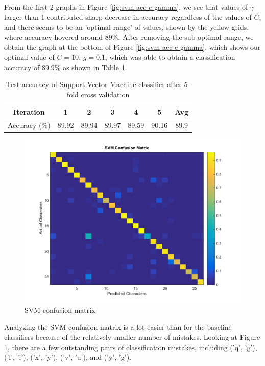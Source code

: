 \documentclass{article} %
\begin{document}
From the first 2 graphs in Figure \ref{fig:svm-acc-c-gamma}, we see that values of $\gamma$ larger than 1 contributed sharp decrease in accuracy regardless of the values of $C$, and there seems to be an 'optimal range' of values, shown by the yellow grids, where accuracy hovered around 89\%. After removing the sub-optimal range, we obtain the graph at the bottom of Figure \ref{fig:svm-acc-c-gamma}, which shows our optimal value of $C=10$, $g=0.1$, which was able to obtain a classification accuracy of $89.9\%$ as shown in Table \ref{tab:svm-cross-val}.

\begin{table}[h]
\centering
\begin{tabular}{|c|c|c|c|c|c|c|}
\hline
Iteration & 1 & 2 & 3 & 4 & 5 & Avg \\
\hline 
Accuracy (\%) & 89.92 & 89.94 & 89.97 & 89.59 & 90.16 & 89.9 \\
\hline 
\end{tabular}
\caption{Test accuracy of Support Vector Machine classifier after 5-fold cross validation}
\label{tab:svm-cross-val}
\end{table}

\begin{figure}[h]
\begin{center}
\includegraphics[scale=0.3]{confusion_svm.png}
\end{center}
\caption{SVM confusion matrix}
\label{fig:svm-conf-mat}
\end{figure}

Analyzing the SVM confusion matrix is a lot easier than for the baseline classifiers because of the relatively smaller number of mistakes. Looking at Figure \ref{fig:svm-conf-mat}, there are a few outstanding pairs of classification mistakes, including ('q', 'g'), ('l', 'i'), ('x', 'y'), ('v', 'u'), and ('y', 'g').
\end{document}
